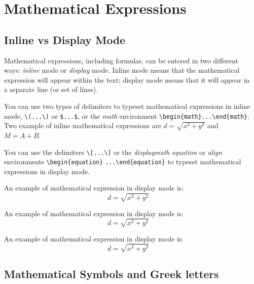 \documentclass[11pt,twoside,openright]{report}
\begin{document}
\section{Mathematical Expressions}
\label{sec:Math}

\subsection{Inline vs Display Mode}
\label{sec:MathModes}

Mathematical expressions, including formulas, can be entered in two different ways: \emph{inline} mode or \emph{display} mode. 
Inline mode means that the mathematical expression will appear within the text; display mode means that it will appear in a separate line (or set of lines).

You can use two types of delimiters to typeset mathematical expressions in inline mode, \verb|\(...\)| or \verb|$...$|, or the \emph{math} environment \verb|\begin{math}...\end{math}|. 
Two example of inline mathematical expressions are \(d=\sqrt{x^2+y^2}\) and $M = A + B$.

You can use the delimiters \verb|\[...\]| or the \emph{displaymath} \emph{equation} or \emph{align} environments \verb|\begin{equation}| \verb|...\end{equation}| to typeset mathematical expressions in display mode.

An example of mathematical expression in display mode is: \[d=\sqrt{x^2+y^2}\]

An example of mathematical expression in display mode is: \begin{displaymath}d=\sqrt{x^2+y^2}\end{displaymath}

An example of mathematical expression in display mode is: \begin{equation}d=\sqrt{x^2+y^2}\end{equation}



\subsection{Mathematical Symbols and Greek letters}
\label{sec:MathSymbols}
\end{document}
